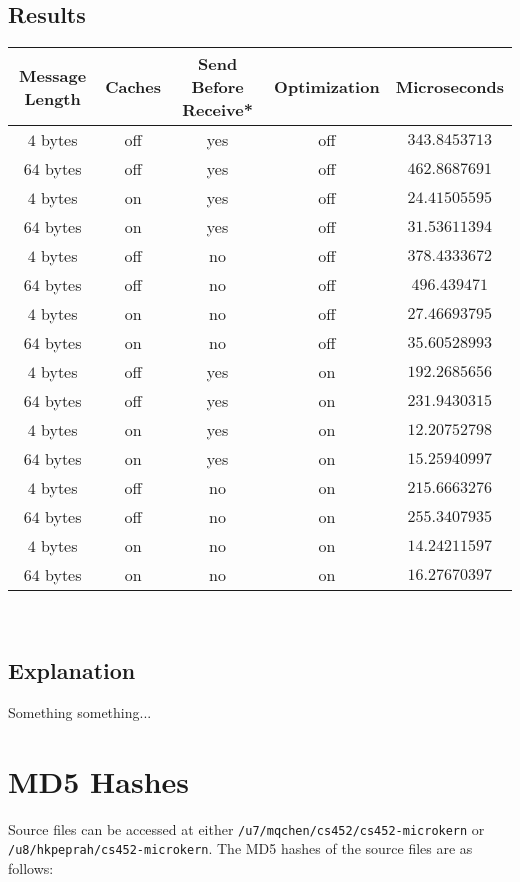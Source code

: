 \documentclass[12pt]{article}
\begin{document}
\subsection{Results}
\begin{tabular}{|c|c|c|c||c|}
  \hline
  {\bf Message Length} & {\bf Caches} & {\bf Send Before Receive*} & {\bf Optimization } & {\bf Microseconds} \\\hline
  $4$ bytes & off & yes & off & $343.8453713$ \\\hline
  $64$ bytes & off & yes & off & $462.8687691$ \\\hline
  $4$ bytes & on & yes & off & $24.41505595$ \\\hline
  $64$ bytes & on & yes & off & $31.53611394$ \\\hline
  $4$ bytes & off & no & off & $378.4333672$ \\\hline
  $64$ bytes & off & no & off & $496.439471$ \\\hline
  $4$ bytes & on & no & off & $27.46693795$ \\\hline
  $64$ bytes & on & no & off & $35.60528993$ \\\hline
  $4$ bytes & off & yes & on & $192.2685656$ \\\hline
  $64$ bytes & off & yes & on & $231.9430315$ \\\hline
  $4$ bytes & on & yes & on & $12.20752798$ \\\hline
  $64$ bytes & on & yes & on & $15.25940997$ \\\hline
  $4$ bytes & off & no & on & $215.6663276$ \\\hline
  $64$ bytes & off & no & on & $255.3407935$ \\\hline
  $4$ bytes & on & no & on & $14.24211597$ \\\hline
  $64$ bytes & on & no & on & $16.27670397$ \\\hline
\end{tabular}
\\[1\baselineskip]
\subsection{Explanation}
Something something...
\\[2\baselineskip]
\section{MD5 Hashes}
Source files can be accessed at either \texttt{/u7/mqchen/cs452/cs452-microkern} or \\ \texttt{/u8/hkpeprah/cs452-microkern}. The MD5 hashes of the source files are as follows:\\
% 
\end{document}
